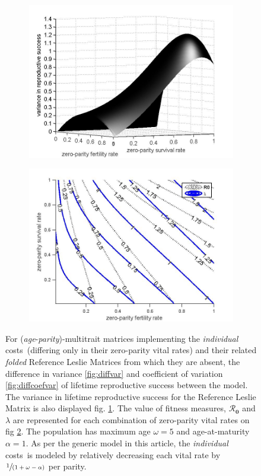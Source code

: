 \documentclass[10pt,a4paper]{article}
\newcommand{\Rzero}{$\boldsymbol{\mathcal{R}_{0}}$  }
\newcommand{\PCoR}{\emph{individual} costs}
\begin{document}
\begin{figure}[htbp]
\begin{subfigure}{.5\textwidth}
\includegraphics[scale=.22]{Varnocor.jpg}
\caption{}
\label{fig:varnocor}
\end{subfigure}%
\begin{subfigure}{.5\textwidth}
\centering
\includegraphics[scale=.22]{lamR03.jpg}
\caption{}
\label{fig:lamminusrzero}
\end{subfigure}

\caption{ For (\emph{age}-\emph{parity})-multitrait matrices implementing the \PCoR\ (differing only in their zero-parity vital rates) and their related \emph{folded} Reference Leslie Matrices from which they are absent, the difference in variance \ref{fig:diffvar}  and coefficient of variation  \ref{fig:diffcoefvar} of lifetime reproductive success between the model. The variance in lifetime reproductive success for the Reference Leslie Matrix is also displayed fig. \ref{fig:varnocor}. The value of fitness measures, \Rzero  and $\lambda$ are represented for each combination of zero-parity vital rates  on fig \ref{fig:lamminusrzero}. The population has maximum age $\omega=5$ and age-at-maturity $\alpha=1$. As per the generic model in this article, the \PCoR\ is modeled by relatively decreasing each vital rate by $\sfrac{1}{(1+\omega -\alpha)}$ per parity.}
\label{fig:varreprosuccess}
\end{figure}
\end{document}
